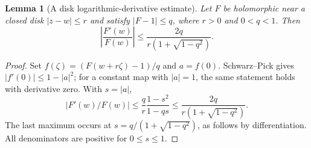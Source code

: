 \documentclass[11pt]{article}
\newtheorem{lemma}[theorem]{Lemma}
\theoremstyle{remark}
\newcommand{\abs}[1]{\left\lvert#1\right\rvert}
\numberwithin{equation}{section}
\begin{document}
\begin{lemma}[A disk logarithmic-derivative estimate]\label{lem:disk}
Let $F$ be holomorphic near a closed disk $|z-w|\le r$ and satisfy
$|F-1|\le q$, where $r>0$ and $0<q<1$. Then
\begin{equation}\label{eq:disk}
 \abs{\frac{F'(w)}{F(w)}}
 \le\frac{2q}{r(1+\sqrt{1-q^2})}.
\end{equation}
\end{lemma}
\begin{proof}
Set $f(\zeta)=(F(w+r\zeta)-1)/q$ and $a=f(0)$.
Schwarz--Pick gives $|f'(0)|\le1-|a|^2$; for a constant map with
$|a|=1$, the same statement holds with derivative zero. With $s=|a|$,
\[
 \abs{F'(w)/F(w)}
 \le\frac q r\frac{1-s^2}{1-qs}
 \le\frac{2q}{r(1+\sqrt{1-q^2})}.
\]
The last maximum occurs at $s=q/(1+\sqrt{1-q^2})$, as follows by
differentiation. All denominators are positive for $0\le s\le1$.
\end{proof}
\end{document}
